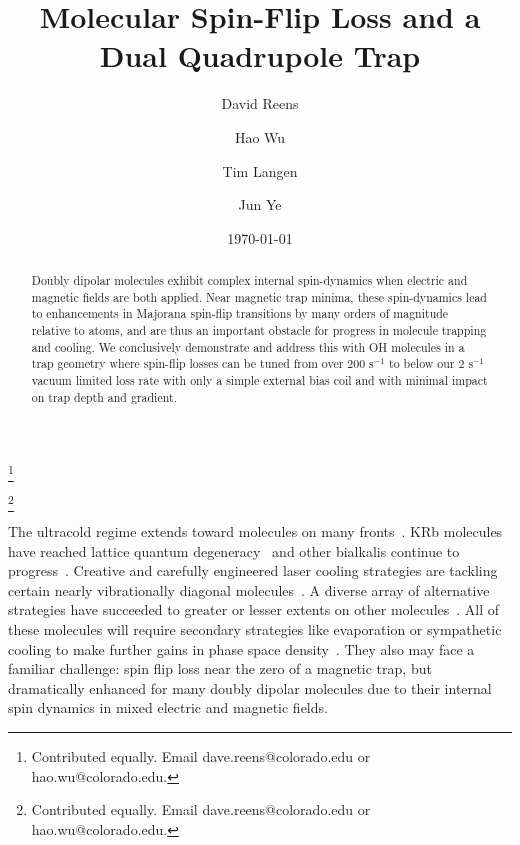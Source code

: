 \documentclass[%
 reprint,
 amsmath,amssymb,
 aps,
prl,
]{revtex4-1}
\begin{document}

\title{Molecular Spin-Flip Loss and a Dual Quadrupole Trap}%

\author{David Reens}
\thanks{Contributed equally. Email dave.reens@colorado.edu or hao.wu@colorado.edu.}

\author{Hao Wu}
\thanks{Contributed equally. Email dave.reens@colorado.edu or hao.wu@colorado.edu.}

\author{Tim Langen}%

\author{Jun Ye}


\date{\today}


\begin{abstract}
Doubly dipolar molecules exhibit complex internal spin-dynamics when electric and magnetic fields are both applied. 
Near magnetic trap minima, these spin-dynamics lead to enhancements in Majorana spin-flip transitions by many orders of magnitude relative to atoms, and are thus an important obstacle for progress in molecule trapping and cooling. 
We conclusively demonstrate and address this with OH molecules in a trap geometry where spin-flip losses can be tuned from over $200 \text{ s}^{-1} $ to below our $2\text{ s}^{-1}$ vacuum limited loss rate with only a simple external bias coil and with minimal impact on trap depth and gradient.
\end{abstract}


\maketitle



The ultracold regime extends toward molecules on many fronts~\cite{Carr2009}. 
KRb molecules have reached lattice quantum degeneracy~\cite{Moses2015} and other bialkalis continue to progress~\cite{Takekoshi2014, Park2015,Guo2016,Liu2017}. 
Creative and carefully engineered laser cooling strategies are tackling certain nearly vibrationally diagonal molecules~\cite{Stuhl2008,Shuman2010,Hummon2013, Barry2014, Zhelyazkova2014, Steinecker2016, Hemmerling2016}. 
A diverse array of alternative strategies have succeeded to greater or lesser extents on other molecules~\cite{Doyle1998, Bethlem1999, Bochinski2003, Narevicius2008, Wiederkehr2012, Prehn2016,Liu2017a}. 
All of these molecules will require secondary strategies like evaporation or sympathetic cooling to make further gains in phase space density~\cite{Parazzoli2011, Stuhl2012evap, Quemener2016}. 
They also may face a familiar challenge: spin flip loss near the zero of a magnetic trap, but dramatically enhanced for many doubly dipolar molecules due to their internal spin dynamics in mixed electric and magnetic fields. 
\end{document}
